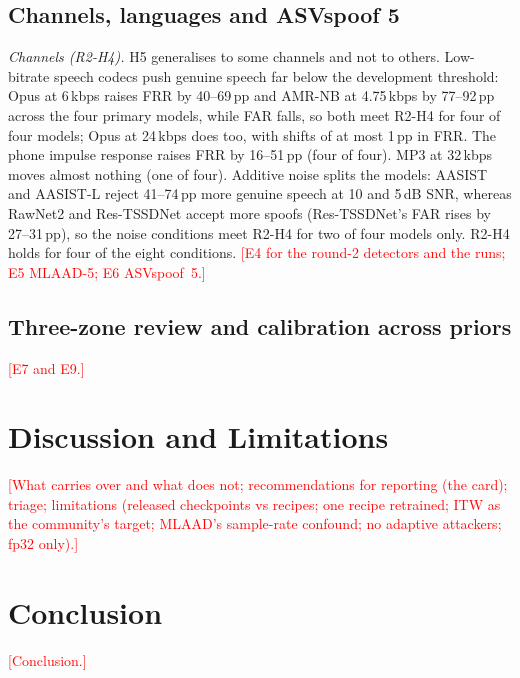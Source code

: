 \documentclass[journal]{IEEEtran}
\newcommand{\todo}[1]{\textcolor{red}{[#1]}}
\begin{document}
\subsection{Channels, languages and ASVspoof 5}
\emph{Channels (R2-H4).} H5 generalises to some channels and not to others. Low-bitrate speech codecs push genuine speech
far below the development threshold: Opus at 6\,kbps raises FRR by 40--69\,pp and AMR-NB at 4.75\,kbps by 77--92\,pp across
the four primary models, while FAR falls, so both meet R2-H4 for four of four models; Opus at 24\,kbps does too, with
shifts of at most 1\,pp in FRR. The phone impulse response raises FRR by 16--51\,pp (four of four). MP3 at 32\,kbps moves
almost nothing (one of four). Additive noise splits the models: AASIST and AASIST-L reject 41--74\,pp more genuine speech
at 10 and 5\,dB SNR, whereas RawNet2 and Res-TSSDNet accept more spoofs (Res-TSSDNet's FAR rises by 27--31\,pp), so the
noise conditions meet R2-H4 for two of four models only. R2-H4 holds for four of the eight conditions. \todo{E4 for the
round-2 detectors and the runs; E5 MLAAD-5; E6 ASVspoof~5.}

\subsection{Three-zone review and calibration across priors}
\todo{E7 and E9.}

\section{Discussion and Limitations}
\label{sec:discussion}
\todo{What carries over and what does not; recommendations for reporting (the card); triage; limitations (released
checkpoints vs recipes; one recipe retrained; ITW as the community's target; MLAAD's sample-rate confound; no adaptive
attackers; fp32 only).}

\section{Conclusion}
\label{sec:conclusion}
\todo{Conclusion.}



\end{document}
